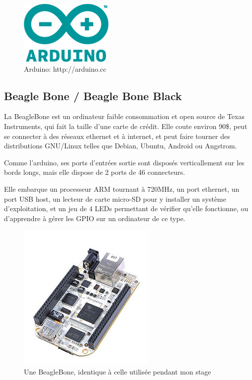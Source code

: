 \documentclass{article}
\begin{document}
\begin{figure}[h!]
    \centering\includegraphics{img/logo.png}
    \caption{Arduino: http://arduino.cc}
\end{figure}

\clearpage

\subsection{Beagle Bone / Beagle Bone Black}
\label{bbb}

La BeagleBone est un ordinateur faible consommation et open source de Texas Instruments, qui fait la taille d’une carte de crédit. Elle coute environ 90\$, peut se connecter à des réseaux ethernet et à internet, et peut faire tourner des distributions GNU/Linux telles que Debian, Ubuntu, Android ou Angstrom.

Comme l’arduino, ses ports d’entrées sortie sont disposés verticallement sur les bords longs, mais elle dispose de 2 ports de 46 connecteurs.

Elle embarque un processeur ARM tournant à 720MHz, un port ethernet, un port USB host, un lecteur de carte micro-SD pour y installer un système d’exploitation, et un jeu de 4 LEDs permettant de vérifier qu’elle fonctionne, ou d’apprendre à gérer les GPIO sur un ordinateur de ce type.

\begin{figure}[h!]
    \centering\includegraphics[width=\linewidth/2]{img/bb.jpg}
    \caption{Une BeagleBone, identique à celle utilisée pendant mon stage}
\end{figure}
\end{document}
